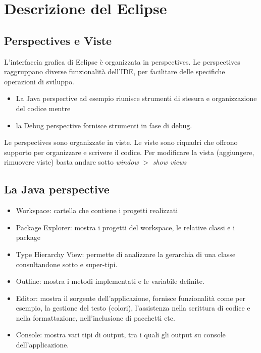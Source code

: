 \documentclass{article}
\begin{document}
\section{Descrizione del Eclipse}

\subsection{Perspectives e Viste}
L'interfaccia grafica di Eclipse \`e organizzata in perspectives. Le perspectives raggruppano diverse funzionalità dell'IDE, per facilitare delle specifiche  operazioni di sviluppo. 
\begin{itemize}
\item La Java perspective ad esempio riunisce strumenti di stesura e organizzazione 
del codice mentre 
\item la Debug perspective fornisce strumenti in fase di debug.
\end{itemize}
Le perspectives sono organizzate in viste. Le viste sono riquadri che offrono supporto per organizzare e scrivere il codice. Per modificare la vista (aggiungere, rimuovere viste) basta andare sotto 
\textit{window} $>$ \textit{show views}


\subsection{La Java perspective}
\begin{itemize}
\item Workspace: cartella che contiene i progetti realizzati
\item Package Explorer: mostra i progetti del workspace, le relative classi e i package 
\item Type Hierarchy View: permette di analizzare la gerarchia di una classe consultandone sotto e super-tipi.
\item Outline: mostra i metodi  implementati e le variabile  definite.
\item Editor: mostra il sorgente dell'applicazione, fornisce funzionalit\` a come per esempio, la gestione del testo (colori), l'assistenza nella scrittura di codice e nella formattazione, nell'inclusione di pacchetti etc.
\item Console: mostra vari tipi di output, tra i quali gli output su console dell'applicazione.
\end{itemize}

\end{document}

